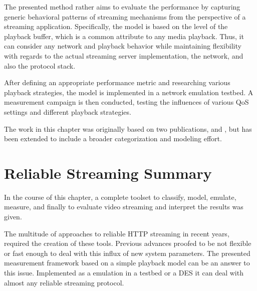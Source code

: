 The presented method rather aims to evaluate the performance by capturing generic behavioral patterns of streaming mechanisms from the perspective of a streaming application. Specifically, the model is based on the level of the playback buffer, which is a common attribute to any media playback. Thus, it can consider any network and playback behavior while maintaining flexibility with regards to the actual streaming server implementation, the network, and also the protocol stack.

After defining an appropriate performance metric and researching various playback strategies, the model is implemented in a network emulation testbed. A measurement campaign is then conducted, testing the influences of various \gls{QoS} settings and different playback strategies. 

The work in this chapter was originally based on two publications, \cite{metzger2011delivery} and \cite{6229739}, but has been extended to include a broader categorization and modeling effort.










\section{Reliable Streaming Summary}
\label{c3:sec:conclusion}

In the course of this chapter, a complete toolset to classify, model, emulate, measure, and finally to evaluate video streaming and interpret the results was given.

The multitude of approaches to reliable \gls{HTTP} streaming in recent years, required the creation of these tools. Previous advances proofed to be not flexible or fast enough to deal with this influx of new system parameters. The presented measurement framework based on a simple playback model can be an answer to this issue. Implemented as a emulation in a testbed or a \gls{DES} it can deal with almost any reliable streaming protocol.

